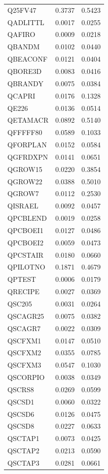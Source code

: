 \begin{longtable}{lcc}
Q25FV47 & 0.3737 & 0.5423 \\
QADLITTL & 0.0017 & 0.0255 \\
QAFIRO & 0.0009 & 0.0218 \\
QBANDM & 0.0102 & 0.0440 \\
QBEACONF & 0.0121 & 0.0404 \\
QBORE3D & 0.0083 & 0.0416 \\
QBRANDY & 0.0075 & 0.0384 \\
QCAPRI & 0.0176 & 0.1328 \\
QE226 & 0.0136 & 0.0514 \\
QETAMACR & 0.0892 & 0.5140 \\
QFFFFF80 & 0.0589 & 0.1033 \\
QFORPLAN & 0.0152 & 0.0584 \\
QGFRDXPN & 0.0141 & 0.0651 \\
QGROW15 & 0.0220 & 0.3854 \\
QGROW22 & 0.0388 & 0.5010 \\
QGROW7 & 0.0112 & 0.2530 \\
QISRAEL & 0.0092 & 0.0457 \\
QPCBLEND & 0.0019 & 0.0258 \\
QPCBOEI1 & 0.0127 & 0.0486 \\
QPCBOEI2 & 0.0059 & 0.0473 \\
QPCSTAIR & 0.0180 & 0.0660 \\
QPILOTNO & 0.1871 & 0.4679 \\
QPTEST & 0.0006 & 0.0179 \\
QRECIPE & 0.0027 & 0.0369 \\
QSC205 & 0.0031 & 0.0264 \\
QSCAGR25 & 0.0075 & 0.0382 \\
QSCAGR7 & 0.0022 & 0.0309 \\
QSCFXM1 & 0.0147 & 0.0510 \\
QSCFXM2 & 0.0355 & 0.0785 \\
QSCFXM3 & 0.0547 & 0.1030 \\
QSCORPIO & 0.0038 & 0.0349 \\
QSCRS8 & 0.0269 & 0.0599 \\
QSCSD1 & 0.0060 & 0.0322 \\
QSCSD6 & 0.0126 & 0.0475 \\
QSCSD8 & 0.0227 & 0.0633 \\
QSCTAP1 & 0.0073 & 0.0425 \\
QSCTAP2 & 0.0213 & 0.0590 \\
QSCTAP3 & 0.0281 & 0.0661 \\

\end{longtable}
